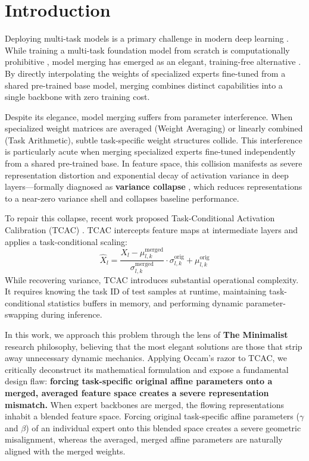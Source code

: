 \documentclass{article}
\theoremstyle{plain}
\theoremstyle{definition}
\theoremstyle{remark}
\begin{document}
\section{Introduction}
\label{submission-introduction}
Deploying multi-task models is a primary challenge in modern deep learning \cite{caruana1997mtl, chen2018gradnorm, yu2020pcgrad, sener2018mgda}. While training a multi-task foundation model from scratch is computationally prohibitive \cite{devlin2018bert, brown2020gpt3, dosovitskiy2020vit}, model merging has emerged as an elegant, training-free alternative \cite{ilharco2022taskarithmetic, yadav2023ties, yu2024dare, ainsworth2022gitrebasin, matena2022fisher}. By directly interpolating the weights of specialized experts fine-tuned from a shared pre-trained base model, merging combines distinct capabilities into a single backbone with zero training cost.

Despite its elegance, model merging suffers from parameter interference. When specialized weight matrices are averaged (Weight Averaging) or linearly combined (Task Arithmetic), subtle task-specific weight structures collide. This interference is particularly acute when merging specialized experts fine-tuned independently from a shared pre-trained base. In feature space, this collision manifests as severe representation distortion and exponential decay of activation variance in deep layers—formally diagnosed as \textbf{variance collapse} \cite{jordan2022repair}, which reduces representations to a near-zero variance shell and collapses baseline performance.

To repair this collapse, recent work proposed Task-Conditional Activation Calibration (TCAC) \cite{jordan2022repair}. TCAC intercepts feature maps at intermediate layers and applies a task-conditional scaling:
\begin{equation}
\hat{X}_l = \frac{X_l - \mu_{l,k}^{\text{merged}}}{\sigma_{l,k}^{\text{merged}}} \cdot \sigma_{l,k}^{\text{orig}} + \mu_{l,k}^{\text{orig}}
\end{equation}
While recovering variance, TCAC introduces substantial operational complexity. It requires knowing the task ID of test samples at runtime, maintaining task-conditional statistics buffers in memory, and performing dynamic parameter-swapping during inference.

In this work, we approach this problem through the lens of \textbf{The Minimalist} research philosophy, believing that the most elegant solutions are those that strip away unnecessary dynamic mechanics. Applying Occam's razor to TCAC, we critically deconstruct its mathematical formulation and expose a fundamental design flaw: \textbf{forcing task-specific original affine parameters onto a merged, averaged feature space creates a severe representation mismatch.} When expert backbones are merged, the flowing representations inhabit a blended feature space. Forcing original task-specific affine parameters ($\gamma$ and $\beta$) of an individual expert onto this blended space creates a severe geometric misalignment, whereas the averaged, merged affine parameters are naturally aligned with the merged weights.
\end{document}
